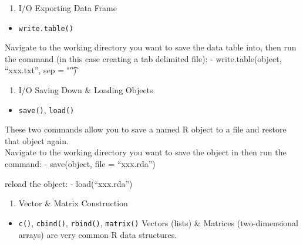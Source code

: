 \documentclass[]{book}
\providecommand{\tightlist}{%
  \setlength{\itemsep}{0pt}\setlength{\parskip}{0pt}}
\begin{document}
\begin{enumerate}
\def\labelenumi{\arabic{enumi}.}
\setcounter{enumi}{6}
\tightlist
\item
  I/O Exporting Data Frame
\end{enumerate}

\begin{itemize}
\tightlist
\item
  \texttt{write.table()}
\end{itemize}

Navigate to the working directory you want to save the data table into, then run the command (in this case creating a tab delimited file):
- write.table(object, ``xxx.txt'', sep = "\t")

\begin{enumerate}
\def\labelenumi{\arabic{enumi}.}
\setcounter{enumi}{7}
\tightlist
\item
  I/O Saving Down \& Loading Objects
\end{enumerate}

\begin{itemize}
\tightlist
\item
  \texttt{save()}, \texttt{load()}
\end{itemize}

These two commands allow you to save a named R object to a file and restore that object again.\\
Navigate to the working directory you want to save the object in then run the command:
- save(object, file = ``xxx.rda'')

reload the object:
- load(``xxx.rda'')

\begin{enumerate}
\def\labelenumi{\arabic{enumi}.}
\setcounter{enumi}{8}
\tightlist
\item
  Vector \& Matrix Construction
\end{enumerate}

\begin{itemize}
\tightlist
\item
  \texttt{c()}, \texttt{cbind()}, \texttt{rbind()}, \texttt{matrix()}
  Vectors (lists) \& Matrices (two-dimensional arrays) are very common R data structures.
\end{itemize}
\end{document}
